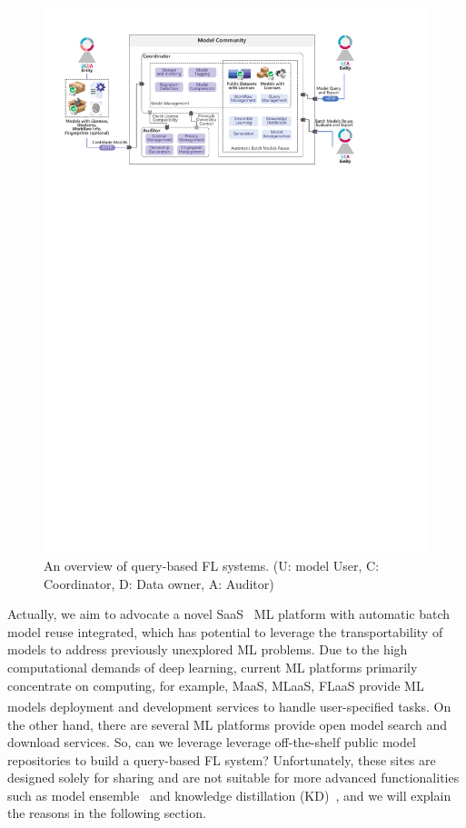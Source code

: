\begin{figure}[t]
  \centering
  \includegraphics[width=\linewidth]{fig/query_frame.pdf}
  \caption{An overview of query-based FL systems. (U: model User, C: Coordinator, D: Data owner, A: Auditor)}
  \label{fig:query}
\end{figure}

Actually, we aim to advocate a novel SaaS~\cite{brereton1999future} ML platform with automatic batch model reuse integrated, which has potential to leverage the transportability of models to address previously unexplored ML problems.
Due to the high computational demands of deep learning, current ML platforms primarily concentrate on computing, for example, MaaS, MLaaS, FLaaS provide ML models deployment and development services to handle user-specified tasks\textsuperscript{}.
On the other hand, there are several ML platforms provide open model search and download services. 
So, can we leverage leverage off-the-shelf public model repositories to build a query-based FL system?
Unfortunately, these sites are designed solely for sharing and are not suitable for more advanced functionalities such as model ensemble~\cite{jacobs1991adaptive} and knowledge distillation (KD)~\cite{hinton2015distilling}, and we will explain the reasons in the following section.

